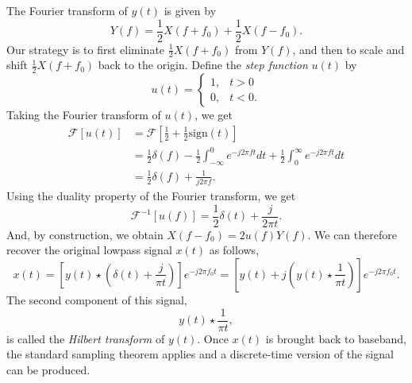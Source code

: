 The Fourier transform of $y(t)$ is given by
\begin{equation*}
Y(f) = \frac{1}{2} X(f+f_0) + \frac{1}{2} X(f - f_0) .
\end{equation*}
Our strategy is to first eliminate $\frac{1}{2} X(f + f_0)$ from $Y(f)$, and then to scale and shift $\frac{1}{2} X(f + f_0)$ back to the origin.
Define the \emph{step function} $u(t)$ by
\begin{equation*}
u (t) = \begin{cases} 1, & t > 0 \\
0, & t < 0. \end{cases}
\end{equation*}
Taking the Fourier transform of $u(t)$, we get
\begin{equation*}
\begin{split}
{\mathcal{F}} [u (t)]
&= {\mathcal{F}} \left[ \frac{1}{2} + \frac{1}{2} \mathrm{sign}(t) \right] \\
&= \frac{1}{2} \delta (f)
- \frac{1}{2} \int_{-\infty}^0 e^{-j2 \pi ft} dt
+ \frac{1}{2} \int_0^{\infty} e^{-j2 \pi ft} dt \\
&= \frac{1}{2} \delta(f)  + \frac{1}{j2 \pi f}.
\end{split}
\end{equation*}
Using the duality property of the Fourier transform, we get
\begin{equation*}
\mathcal{F}^{-1} [u(f)] = \frac{1}{2} \delta(t) + \frac{j}{2 \pi t} .
\end{equation*}
And, by construction, we obtain $X(f - f_0) = 2 u(f) Y(f)$.
We can therefore recover the original lowpass signal $x(t)$ as follows,
\begin{equation*}
x(t)
= \left[ y(t) \star \left( \delta (t) + \frac{j}{\pi t} \right) \right] e^{- j2 \pi f_0 t}
= \left[ y(t) + j \left( y(t) \star \frac{1}{\pi t} \right) \right] e^{- j2 \pi f_0 t} .
\end{equation*}
The second component of this signal,
\begin{equation*}
y(t) \star \frac{1}{\pi t} ,
\end{equation*}
is called the \emph{Hilbert transform} of $y(t)$.
Once $x(t)$ is brought back to baseband, the standard sampling theorem applies and a discrete-time version of the signal can be produced.

